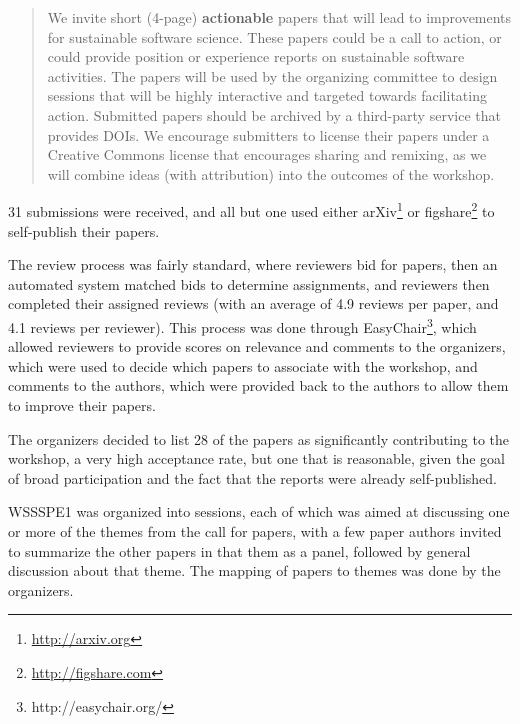 \documentclass[11pt, oneside]{amsart}
\begin{document}
\begin{quote}
We invite short (4-page) \textbf{actionable} papers that will lead to
improvements for sustainable software science. These papers could be a call to
action, or could provide position or experience reports on sustainable software
activities. The papers will be used by the organizing committee to design
sessions that will be highly interactive and targeted towards facilitating
action. Submitted papers should be archived by a third-party service that
provides DOIs. We encourage submitters to license their papers under a Creative
Commons license that encourages sharing and remixing, as we will combine ideas
(with attribution) into the outcomes of the workshop.
\end{quote}

31 submissions were received, and all but one used either
arXiv\footnote{\url{http://arxiv.org}} or
figshare\footnote{\url{http://figshare.com}} to self-publish their papers.

The review process was fairly standard, where reviewers bid for papers, then an
automated system
matched bids to determine assignments, and reviewers then completed their
assigned
reviews (with an average of 4.9 reviews per paper, and 4.1 reviews per
reviewer).
This process was done through EasyChair\footnote{http://easychair.org/}, which
allowed reviewers to provide scores on relevance and comments to the organizers,
which were used to decide which papers to associate with the workshop, and
comments to the authors, which were provided back to the authors to allow them
to improve their papers.

The organizers decided to list 28 of the papers as significantly contributing to
the workshop, a very high acceptance rate, but one that is reasonable, given the
goal of broad participation and the fact that the reports were already
self-published.

WSSSPE1 was organized into sessions, each of which was aimed at discussing one
or more of the themes from the call for papers, with a few paper authors invited
to summarize the other papers in that them as a panel, followed by general
discussion about that theme. The mapping of papers to themes was done by the
organizers.
\end{document}
